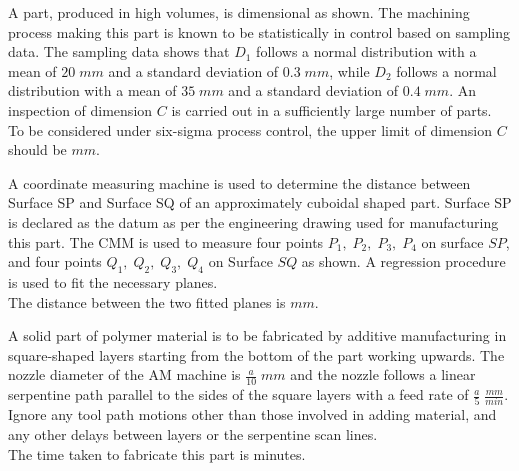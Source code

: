 \iffalse

\chapter{2023}
\section{me}
\author{AI24BTECH11023 - Tarun Reddy Pakala}
\fi
\item A part, produced in high volumes, is dimensional as shown. The machining process making this part is known to be statistically in control based on sampling data. The sampling data shows that $D_1$ follows a normal distribution with a mean of $20\;mm$ and a standard deviation of $0.3\;mm$, while $D_2$ follows a normal distribution with a mean of $35\;mm$ and a standard deviation of $0.4\;mm$. An inspection of dimension $C$ is carried out in a sufficiently large number of parts.\\ To be considered under six-sigma process control, the upper limit of dimension $C$ should be \underline{\hspace{2cm}} $mm$.\\ 

\item A coordinate measuring machine  is used to determine the distance between Surface SP and Surface SQ of an approximately cuboidal shaped part. Surface SP is declared as the datum as per the engineering drawing used for manufacturing this part. The CMM is used to measure four points $P_1,\;P_2,\;P_3,\;P_4$ on surface $SP$, and four points $Q_1,\;Q_2,\;Q_3,\;Q_4$ on Surface $SQ$ as shown. A regression procedure is used to fit the necessary planes.\\ The distance between the two fitted planes is 
\underline{\hspace{2cm}} $mm$.\\ 

\item A solid part  of polymer material is to be fabricated by additive manufacturing  in square-shaped layers starting from the bottom of the part working upwards. The nozzle diameter of the AM machine is $\frac{a}{10}\;mm$ and the nozzle follows a linear serpentine path parallel to the sides of the square layers with a feed rate of $\frac{a}{5}\;\frac{mm}{min}$.\\ Ignore any tool path motions other than those involved in adding material, and any other delays between layers or the serpentine scan lines.\\ The time taken to fabricate this part is \underline{\hspace{2cm}} minutes.\\ 
